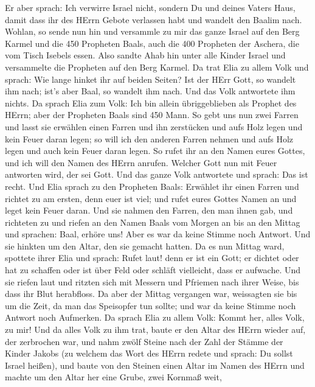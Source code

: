  Er aber sprach: Ich verwirre Israel nicht, sondern Du und
deines Vaters Haus, damit dass ihr des HErrn Gebote verlassen habt und
wandelt den Baalim nach.  Wohlan, so sende nun hin und
versammle zu mir das ganze Israel auf den Berg Karmel und die 450
Propheten Baals, auch die 400 Propheten der Aschera, die vom Tisch
Isebels essen.  Also sandte Ahab hin unter alle Kinder
Israel und versammelte die Propheten auf den Berg Karmel. 
Da trat Elia zu allem Volk und sprach: Wie lange hinket ihr auf beiden
Seiten? Ist der HErr Gott, so wandelt ihm nach; ist's aber Baal, so
wandelt ihm nach. Und das Volk antwortete ihm nichts.  Da
sprach Elia zum Volk: Ich bin allein übriggeblieben als Prophet des
HErrn; aber der Propheten Baals sind 450 Mann.  So gebt uns
nun zwei Farren und lasst sie erwählen einen Farren und ihn zerstücken
und aufs Holz legen und kein Feuer daran legen; so will ich den anderen
Farren nehmen und aufs Holz legen und auch kein Feuer daran legen.
 So rufet ihr an den Namen eures Gottes, und ich will den
Namen des HErrn anrufen. Welcher Gott nun mit Feuer antworten wird, der
sei Gott. Und das ganze Volk antwortete und sprach: Das ist recht.
 Und Elia sprach zu den Propheten Baals: Erwählet ihr einen
Farren und richtet zu am ersten, denn euer ist viel; und rufet eures
Gottes Namen an und leget kein Feuer daran.  Und sie nahmen
den Farren, den man ihnen gab, und richteten zu und riefen an den Namen
Baals vom Morgen an bis an den Mittag und sprachen: Baal, erhöre uns!
Aber es war da keine Stimme noch Antwort. Und sie hinkten um den Altar,
den sie gemacht hatten.  Da es nun Mittag ward, spottete
ihrer Elia und sprach: Rufet laut! denn er ist ein Gott; er dichtet oder
hat zu schaffen oder ist über Feld oder schläft vielleicht, dass er
aufwache.  Und sie riefen laut und ritzten sich mit Messern
und Pfriemen nach ihrer Weise, bis dass ihr Blut herabfloss.
 Da aber der Mittag vergangen war, weissagten sie bis um
die Zeit, da man das Speisopfer tun sollte; und war da keine Stimme noch
Antwort noch Aufmerken.  Da sprach Elia zu allem Volk:
Kommt her, alles Volk, zu mir! Und da alles Volk zu ihm trat, baute er
den Altar des HErrn wieder auf, der zerbrochen war,  und
nahm zwölf Steine nach der Zahl der Stämme der Kinder Jakobs (zu welchem
das Wort des HErrn redete und sprach: Du sollst Israel heißen),
 und baute von den Steinen einen Altar im Namen des HErrn
und machte um den Altar her eine Grube, zwei Kornmaß weit, 
